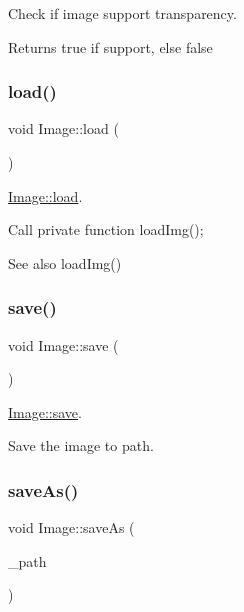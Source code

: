 Check if image support transparency. \begin{DoxyReturn}{Returns}
true if support, else false 
\end{DoxyReturn}
\mbox{\label{class_image_a183b754c660df8caed9088e9915606db}} 
\subsubsection{\texorpdfstring{load()}{load()}}
{\footnotesize\ttfamily void Image\+::load (\begin{DoxyParamCaption}{ }\end{DoxyParamCaption})}



\mbox{\hyperlink{class_image_a183b754c660df8caed9088e9915606db}{Image\+::load}}. 

Call private function load\+Img(); \begin{DoxySeeAlso}{See also}
load\+Img() 
\end{DoxySeeAlso}
\mbox{\label{class_image_a643d9f46961e8372b6a573246aad66d1}} 
\subsubsection{\texorpdfstring{save()}{save()}}
{\footnotesize\ttfamily void Image\+::save (\begin{DoxyParamCaption}{ }\end{DoxyParamCaption})}



\mbox{\hyperlink{class_image_a643d9f46961e8372b6a573246aad66d1}{Image\+::save}}. 

Save the image to path. \mbox{\label{class_image_a6398f48fdb7e200dd237e37644cca406}} 
\subsubsection{\texorpdfstring{saveAs()}{saveAs()}}
{\footnotesize\ttfamily void Image\+::save\+As (\begin{DoxyParamCaption}\item[{Q\+String}]{\+\_\+path }\end{DoxyParamCaption})}



